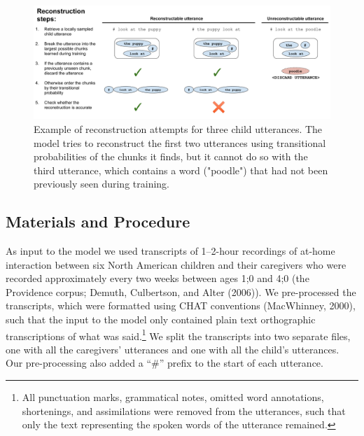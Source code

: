 \documentclass[man,mask,floatsintext]{apa6}
\let\rmarkdownfootnote\footnote%
\def\footnote{\protect\rmarkdownfootnote}
\begin{document}
\begin{figure}
\includegraphics[width=0.99\linewidth]{images/reconstruction_task} \caption{Example of reconstruction attempts for three child utterances. The model tries to reconstruct the first two utterances using transitional probabilities of the chunks it finds, but it cannot do so with the third utterance, which contains a word  ("poodle") that had not been previously seen during training.}\label{fig:fig2}
\end{figure}

\subsection{Materials and Procedure}\label{materials-and-procedure}

As input to the model we used transcripts of 1--2-hour recordings of
at-home interaction between six North American children and their
caregivers who were recorded approximately every two weeks between ages
1;0 and 4;0 (the Providence corpus; Demuth, Culbertson, and Alter
(2006)). We pre-processed the transcripts, which were formatted using
CHAT conventions (MacWhinney, 2000), such that the input to the model
only contained plain text orthographic transcriptions of what was
said.\footnote{All punctuation marks, grammatical notes, omitted word
  annotations, shortenings, and assimilations were removed from the
  utterances, such that only the text representing the spoken words of
  the utterance remained.} We split the transcripts into two separate
files, one with all the caregivers' utterances and one with all the
child's utterances. Our pre-processing also added a \enquote{\#} prefix
to the start of each utterance.
\end{document}
